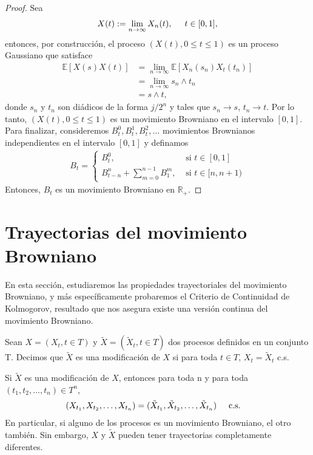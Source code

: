 \begin{proof}
Sea 
	\begin{align*}
		X(t) := \lim_{n \rightarrow \infty} X_n (t), \hspace{0.5cm} t \in [0, 1], 
	\end{align*}
entonces, por construcción, el proceso $(X(t), 0 \leq t \leq 1)$ es un proceso Gaussiano que satisface
	\begin{align*}
		\mathbb{E} \left[ X(s) X(t) \right] & = \lim_{n \rightarrow \infty} \mathbb{E} [X_n (s_n) X_t (t_n)] \\
		& = \lim_{n \rightarrow \infty} s_n \wedge t_n \\
		& = s \wedge t, 
	\end{align*}
donde $s_n$ y $t_n$ son diádicos de la forma $j / 2^n$ y tales que $s_n \rightarrow s$, $t_n \rightarrow t$. Por lo tanto, $(X (t), 0 \leq t \leq 1)$ es un movimiento Browniano en el intervalo $[0, 1]$. \\

Para finalizar, consideremos $B_t^0, B_t^1, B_t^2, \ldots$ movimientos Brownianos independientes en el intervalo $[0, 1]$ y definamos
	\begin{align*}
		B_t = 
		\begin{cases}
		B_t^0, & \text{ si } t \in [0, 1] \\
		B_{t-n}^n + \sum_{m = 0}^{n-1} B_1^m, & \text{ si } t \in [n, n+1)
		\end{cases}
	\end{align*}
Entonces, $B_t$ es un movimiento Browniano en $\mathbb{R}_{+}$.
\end{proof}

\section{Trayectorias del movimiento Browniano}
En esta sección, estudiaremos las propiedades trayectoriales del movimiento Browniano, y más específicamente probaremos el Criterio de Continuidad de Kolmogorov, resultado que nos asegura existe una versión continua del movimiento Browniano.

\begin{definition}
Sean $X = (X_t, t \in T)$ y $\tilde{X} = (\tilde{X}_t, t \in T)$ dos procesos definidos en un conjunto T. Decimos que $\tilde{X}$ es una modificación de $X$ si para toda $t \in T$, $X_t = \tilde{X}_t$ c.s.
\end{definition}

Si $\tilde{X}$ es una modificación de $X$, entonces para toda n y para toda $(t_1, t_2, \ldots, t_n) \in T^n$, 
  \begin{align*}
	(X_{t_1}, X_{t_2}, \ldots, X_{t_n}) & = (\tilde{X}_{t_1}, \tilde{X}_{t_2}, \ldots, \tilde{X}_{t_n}) \hspace{0.5cm} \text{c.s.}
  \end{align*}
En particular, si alguno de los procesos es un movimiento Browniano, el otro también. Sin embargo, $X$ y $\tilde{X}$ pueden tener trayectorias completamente diferentes.

